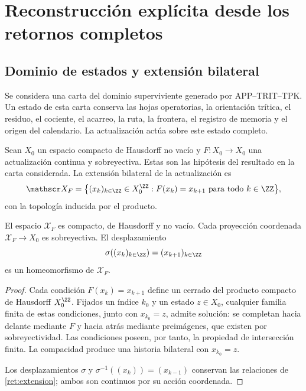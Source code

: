 \section{Reconstrucción explícita desde los retornos completos}
\label{ret:seccion}

\subsection{Dominio de estados y extensión bilateral}

Se considera una carta del dominio superviviente generado por
APP--TRIT--TPK. Un estado de esta carta conserva las hojas operatorias,
la orientación trítica, el residuo, el cociente, el acarreo, la ruta,
la frontera, el registro de memoria y el origen del calendario.
La actualización actúa sobre este estado completo.

Sean \(X_0\) un espacio compacto de Hausdorff no vacío y
\(F:X_0\to X_0\) una actualización continua y sobreyectiva.
Estas son las hipótesis del resultado en la carta considerada.
La extensión bilateral de la actualización es
\begin{equation}
 \mathscr X_F=
 \bigl\{(x_k)_{k\in\ZZ}\in X_0^{\ZZ}:
                  F(x_k)=x_{k+1}\text{ para todo }k\in\ZZ\bigr\},
 \label{ret:extension}
\end{equation}
con la topología inducida por el producto.

\begin{lemma}
\label{ret:existencia}
El espacio \(\mathscr X_F\) es compacto, de Hausdorff y no vacío.
Cada proyección coordenada \(\mathscr X_F\to X_0\) es sobreyectiva.
El desplazamiento
\[
 \sigma((x_k)_{k\in\ZZ})=(x_{k+1})_{k\in\ZZ}
\]
es un homeomorfismo de \(\mathscr X_F\).
\end{lemma}
\begin{proof}
Cada condición \(F(x_k)=x_{k+1}\) define un cerrado del producto
compacto de Hausdorff \(X_0^{\ZZ}\).
Fijados un índice \(k_0\) y un estado \(z\in X_0\), cualquier familia
finita de estas condiciones, junto con \(x_{k_0}=z\), admite solución:
se completan hacia delante mediante \(F\) y hacia atrás mediante
preimágenes, que existen por sobreyectividad. Las condiciones poseen,
por tanto, la propiedad de intersección finita. La compacidad produce
una historia bilateral con \(x_{k_0}=z\).

Los desplazamientos \(\sigma\) y
\(\sigma^{-1}((x_k))=(x_{k-1})\) conservan las relaciones de
\eqref{ret:extension}; ambos son continuos por su acción coordenada.
\end{proof}

